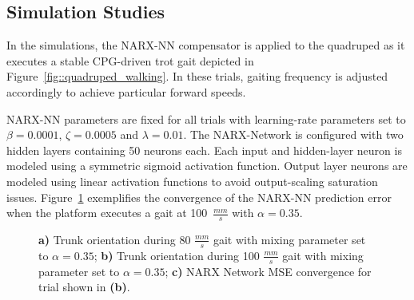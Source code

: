 \subsection{Simulation Studies}


In the simulations, the NARX-NN compensator is applied to the quadruped as it executes a stable CPG-driven trot gait
depicted in  Figure~\ref{fig::quadruped_walking}. In these trials, gaiting frequency is adjusted accordingly to achieve 
particular forward speeds.

NARX-NN parameters are fixed for all trials with learning-rate  parameters set to $\beta=0.0001$, $\zeta=0.0005$ and $\lambda = 0.01$.
The NARX-Network is configured with two hidden layers containing 50 neurons each. Each input and hidden-layer neuron is 
modeled using a symmetric sigmoid activation function. Output layer neurons are modeled using linear activation functions to 
avoid output-scaling saturation issues. Figure~\ref{fig::fast} exemplifies the convergence of the NARX-NN
prediction error when the platform executes a gait at  100~$\frac{mm}{s}$ with $\alpha = 0.35$.

\begin{figure}[h!]
	\centering
	\begin{subfigure}{0.475\textwidth}
		\centering
		\caption{ }
	\end{subfigure}
	\begin{subfigure}{0.475\textwidth}
		\centering
		\caption{ } 
	\end{subfigure}
	\begin{subfigure}{0.475\textwidth}
		\centering
		\caption{ } 
	\end{subfigure}
	\caption{ 
		\textbf{a)} Trunk orientation during 80 $\frac{mm}{s}$ gait with mixing parameter set to $\alpha = 0.35$;
		\textbf{b)} Trunk orientation during 100 $\frac{mm}{s}$ gait with mixing parameter set to $\alpha = 0.35$;
		\textbf{c)} NARX Network MSE convergence for trial shown in \textbf{(b)}.
	}
	\label{fig::fast}
	\PostImageCloseSpace
\end{figure}

